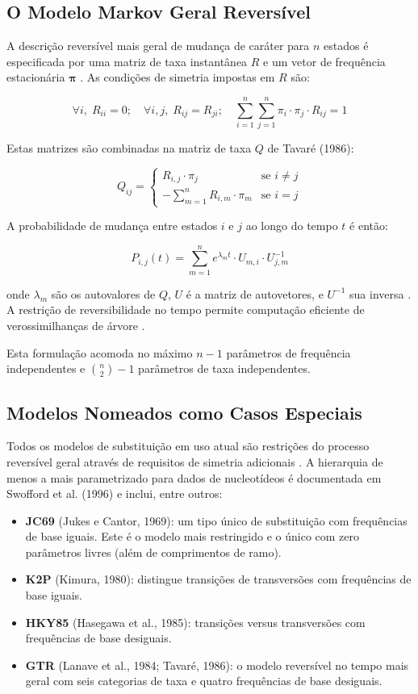 \subsection{O Modelo Markov Geral Reversível}

A descrição reversível mais geral de mudança de caráter para $n$ estados é especificada por uma matriz de taxa instantânea $R$ e um vetor de frequência estacionária $\symbf{\pi}$ \parencite{yang1994,tavare1986}. As condições de simetria impostas em $R$ são:

$$\forall i,\; R_{ii} = 0; \quad \forall i,j,\; R_{ij} = R_{ji}; \quad \sum_{i=1}^{n}\sum_{j=1}^{n} \pi_i \cdot \pi_j \cdot R_{ij} = 1$$

Estas matrizes são combinadas na matriz de taxa $Q$ de Tavaré (1986):

$$Q_{ij} = \begin{cases} R_{i,j} \cdot \pi_j & \text{se } i \neq j \\ -\sum_{m=1}^{n} R_{i,m} \cdot \pi_m & \text{se } i = j \end{cases}$$

A probabilidade de mudança entre estados $i$ e $j$ ao longo do tempo $t$ é então:

$$P_{i,j}(t) = \sum_{m=1}^{n} e^{\lambda_m t} \cdot U_{m,i} \cdot U^{-1}_{j,m}$$

onde $\lambda_m$ são os autovalores de $Q$, $U$ é a matriz de autovetores, e $U^{-1}$ sua inversa \parencite{strang2006}. A restrição de reversibilidade no tempo permite computação eficiente de verossimilhanças de árvore \parencite{wheeler2012}.

Esta formulação acomoda no máximo $n-1$ parâmetros de frequência independentes e $\binom{n}{2} - 1$ parâmetros de taxa independentes.

\subsection{Modelos Nomeados como Casos Especiais}

Todos os modelos de substituição em uso atual são restrições do processo reversível geral através de requisitos de simetria adicionais \parencite{wheeler2012}. A hierarquia de menos a mais parametrizado para dados de nucleotídeos é documentada em Swofford et al. (1996) e inclui, entre outros:

\begin{itemize}
    \item \textbf{JC69} (Jukes e Cantor, 1969): um tipo único de substituição com frequências de base iguais. Este é o modelo mais restringido e o único com zero parâmetros livres (além de comprimentos de ramo).
    \item \textbf{K2P} (Kimura, 1980): distingue transições de transversões com frequências de base iguais.
    \item \textbf{HKY85} (Hasegawa et al., 1985): transições versus transversões com frequências de base desiguais.
    \item \textbf{GTR} (Lanave et al., 1984; Tavaré, 1986): o modelo reversível no tempo mais geral com seis categorias de taxa e quatro frequências de base desiguais.
\end{itemize}

